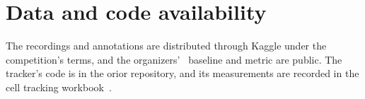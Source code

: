 \section{\texorpdfstring{Data and code availability}{Data and code availability}}

The recordings and annotations are distributed through Kaggle under the competition's terms, and the organizers'~\cite{src:Biohub-competition} baseline and metric are public. The tracker's code is in the orior repository, and its measurements are recorded in the cell tracking workbook~\cite{src:Quigg-cell-tracking-workbook}.
